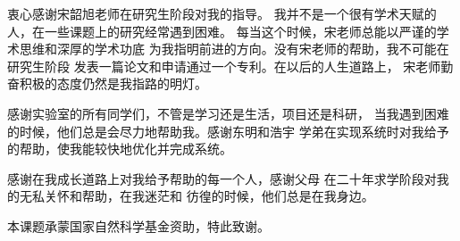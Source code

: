 
\begin{acknowledgements}
  衷心感谢宋韶旭老师在研究生阶段对我的指导。
  我并不是一个很有学术天赋的人，在一些课题上的研究经常遇到困难。
  每当这个时候，宋老师总能以严谨的学术思维和深厚的学术功底
  为我指明前进的方向。没有宋老师的帮助，我不可能在研究生阶段
  发表一篇论文和申请通过一个专利。在以后的人生道路上，
  宋老师勤奋积极的态度仍然是我指路的明灯。

  感谢实验室的所有同学们，不管是学习还是生活，项目还是科研，
  当我遇到困难的时候，他们总是会尽力地帮助我。感谢东明和浩宇
  学弟在实现系统时对我给予的帮助，使我能较快地优化并完成系统。

  感谢在我成长道路上对我给予帮助的每一个人，感谢父母
  在二十年求学阶段对我的无私关怀和帮助，在我迷茫和
  彷徨的时候，他们总是在我身边。

  本课题承蒙国家自然科学基金资助，特此致谢。
\end{acknowledgements}

